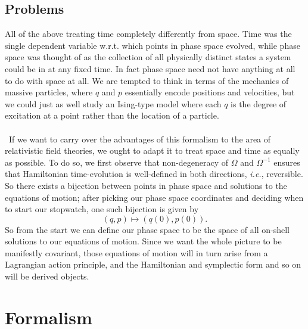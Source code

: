 \documentclass[11pt,letterpaper]{article}
\begin{document}
\subsection{Problems}
All of the above treating time completely differently from space. Time was the single dependent variable w.r.t. which points in phase space evolved, while phase space was thought of as the collection of all physically distinct states a system could be in at any fixed time. In fact phase space need not have anything at all to do with space at all. We are tempted to think in terms of the mechanics of massive particles, where $q$ and $p$ essentially encode positions and velocities, but we could just as well study an Ising-type model where each $q$ is the degree of excitation at a point rather than the location of a particle.\\
\\
\
If we want to carry over the advantages of this formalism to the area of relativistic field theories, we ought to adapt it to treat space and time as equally as possible. To do so, we first observe that non-degeneracy of $\Omega$ and $\Omega^{-1}$ ensures that Hamiltonian time-evolution is well-defined in both directions, \textit{i.e.}, reversible. So there exists a bijection between points in phase space and solutions to the equations of motion; after picking our phase space coordinates and deciding when to start our stopwatch, one such bijection is given by \begin{equation}
(q,p) \mapsto (q(0), p(0)).
\end{equation}
So from the start we can define our phase space to be the space of all on-shell solutions to our equations of motion. Since we want the whole picture to be manifestly covariant, those equations of motion will in turn arise from a Lagrangian action principle, and the Hamiltonian and symplectic form and so on will be derived objects.


\section{Formalism}
\end{document}
